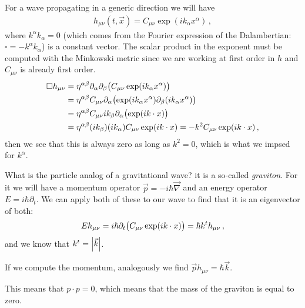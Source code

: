 \documentclass[main.tex]{subfiles}
\begin{document}
For a wave propagating in a generic direction we will have 
%
\begin{align}
h_{\mu \nu } (t, \vec{x}) = C_{\mu \nu } \exp(i k_{\alpha } x^{\alpha })
\,,
\end{align}
%
where \(k^{\alpha } k_{\alpha } = 0\) (which comes from the Fourier expression of the Dalambertian: \(\square = -k^{\alpha } k_{\alpha }\)) is a constant vector. The scalar product in the exponent must be computed with the Minkowski metric since we are working at  first order in \(h\) and \(C_{\mu \nu }\) is already first order.  
%
\begin{align}
\square h_{\mu \nu } &= \eta^{\alpha \beta } \partial_{\alpha } \partial_{\beta } \qty(C_{\mu \nu } \exp(i k_{\alpha }x^{\alpha }))  \\
&= \eta^{\alpha  \beta } C_{\mu \nu } \partial_{\alpha } \qty(\exp(i k_{\alpha } x^{\alpha }) \partial_{\beta } \qty(i k_{\alpha } x^{\alpha }))  \\
&= \eta^{\alpha  \beta } C_{\mu \nu } i k_{ \beta } \partial_{\alpha } \qty(\exp(i k \cdot x )) \\
&= \eta^{\alpha \beta } (i k_{ \beta }) (ik_{\alpha }) C_{\mu \nu } \exp(i k \cdot x) = - k^2 C_{\mu \nu } \exp(i k \cdot x)
\,,
\end{align}
%
then we see that this is always zero as long as \(k^2=0\), which is what we impsed for \(k^{\alpha }\). 

What is the particle analog of a gravitational wave? it is a so-called \emph{graviton}. 
For it we will have a momentum operator \(\vec{p} = - i \hbar \vec{\nabla}\) and an energy operator \(E = i \hbar \partial_{t}\). We can apply both of these to our wave to find that it is an eigenvector of both: 
%
\begin{align}
E h_{\mu \nu } = i \hbar \partial_{t} \qty(C_{\mu \nu } \exp(i k \cdot x))= \hbar k^{t} h_{\mu \nu } 
\,,
\end{align}
%
and we know that \(k^{t} = \abs{\vec{k}}\). 

If we compute the momentum, analogously we find \(\vec{p} h_{\mu \nu } = \hbar \vec{k}\). 

This means that \(p \cdot p  = 0\), which means that the mass of the graviton is equal to zero. 
\end{document}
